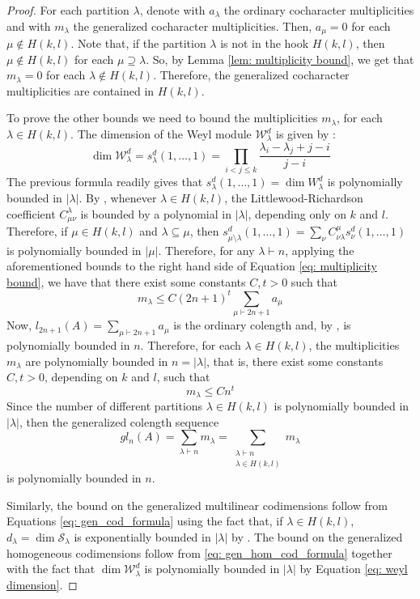 \documentclass{article}
\newcommand{\cS}{\mathcal{S}}
\begin{document}
\begin{proof}
    For each partition $\lambda$, denote with $a_\lambda$ the ordinary cocharacter multiplicities and with $m_\lambda$ the generalized cocharacter multiplicities. Then, $a_\mu=0$ for each $\mu\notin H(k,l)$. Note that, if the partition $\lambda$ is not in the hook $H(k,l)$, then $\mu\notin H(k,l)$ for each $\mu\supseteq \lambda$. So, by Lemma \ref{lem: multiplicity bound}, we get that $m_\lambda=0$ for each $\lambda\notin H(k,l)$. Therefore, the generalized cocharacter multiplicities are contained in $H(k,l)$.
    
    To prove the other bounds we need to bound the multiplicities $m_\lambda$, for each $\lambda\in H(k,l)$. The dimension of the Weyl module $\mathcal{W}_\lambda^d$ is given by \cite[Appendix A]{FH91}: \begin{equation}\label{eq: weyl dimension}
		\dim \mathcal{W}^d_\lambda = s_{\lambda}^d(1,\dots,1)= \prod_{i<j\leq k}\frac{\lambda_i-\lambda_j+j-i}{j-i}
	\end{equation}
    The previous formula readily gives that $s_\lambda^d(1,\dots,1)=\dim W^d_\lambda$ is polynomially bounded in $|\lambda|$. By \cite[Lemma 11]{Ber96}, whenever $\lambda\in H(k,l)$, the Littlewood-Richardson coefficient $C^\lambda_{\mu\nu}$ is bounded by a polynomial in $|\lambda|$, depending only on $k$ and $l$. Therefore, if $\mu \in H(k,l)$ and $\lambda\subseteq \mu$, then $s^d_{\mu\setminus\lambda}(1,\dots,1) = \sum_\nu C^\mu_{\nu\lambda} s^d_\nu (1,\dots,1)$ is polynomially bounded in $|\mu|$. Therefore, for any $\lambda\vdash n$, applying the aforementioned bounds to the right hand side of Equation \eqref{eq: multiplicity bound}, we have that there exist some constants $C,t>0$ such that 
    \[ m_\lambda \leq C(2n+1)^t \sum_{\mu\vdash 2n+1} a_\mu \]
    Now, $l_{2n+1}(A)=\sum_{\mu\vdash 2n+1} a_\mu$ is the ordinary colength and, by \cite{BR83}, is polynomially bounded in $n$. Therefore, for each $\lambda\in H(k,l)$, the multiplicities $m_\lambda$ are polynomially bounded in $n=|\lambda|$, that is, there exist some constants $C,t>0$, depending on $k$ and $l$, such that 
    \[ m_\lambda \leq Cn^t \]
    Since the number of different partitions $\lambda\in H(k,l)$ is polynomially bounded in $|\lambda|$, then the generalized colength sequence 
    \[ gl_n(A) = \sum_{\lambda\vdash n} m_\lambda = \sum_{\substack{\lambda\vdash n \\ \lambda\in H(k,l)}} m_\lambda 
    \]
    is polynomially bounded in $n$.
    
    Similarly, the bound on the generalized multilinear codimensions follow from Equations \eqref{eq: gen_cod_formula} using the fact that, if $\lambda\in H(k,l)$, $d_\lambda=\dim\cS_\lambda$ is exponentially bounded in $|\lambda|$ by \cite{BR87}. The bound on the generalized homogeneous codimensions follow from \eqref{eq: gen_hom_cod_formula} together with the fact that $\dim \mathcal{W}^d_\lambda$ is polynomially bounded in $|\lambda|$ by Equation \eqref{eq: weyl dimension}.    
\end{proof}
\end{document}
